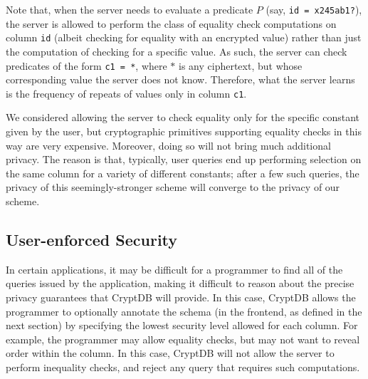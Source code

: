 Note that, when the server needs to evaluate a predicate $P$ (say,
\texttt{id = x245ab1?}), the server is allowed to perform the class
of equality check computations on column {\tt id} (albeit checking for
equality with an encrypted value) rather than just the computation of
checking for a specific value.  As such, the server can check
predicates of the form \texttt{c1 = *}, where $*$ is any ciphertext,
but whose corresponding value the server does not know.  Therefore,
what the server learns is the frequency of repeats of values only in
column \texttt{c1}.

We considered allowing the server to check equality only for the
specific constant given by the user, but cryptographic primitives supporting
equality checks in this way are very expensive. Moreover, doing so will not
bring much additional privacy. The reason is
that, typically, user queries end up performing selection on the same column for
a variety of different constants; after a few such queries, the privacy of this
seemingly-stronger scheme will converge to the privacy of our scheme.

\subsection{User-enforced Security}


In certain applications, it may be difficult for a programmer to find
all of the queries issued by the application, making it difficult
to reason about the precise privacy guarantees that CryptDB will
provide.  In this case, CryptDB allows the programmer to optionally
annotate the schema (in the frontend, as defined in the next section)
by specifying the lowest security level allowed for each column.
For example, the programmer may allow equality checks, but may not
want to reveal order within the column.  In this case, CryptDB will
not allow the server to perform inequality checks, and reject any
query that requires such computations.


